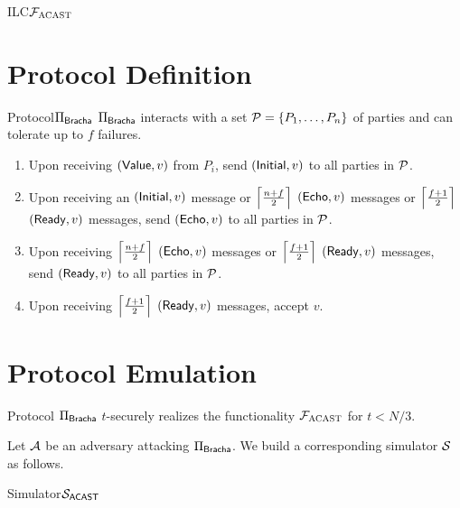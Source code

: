 \documentclass{llncs}
\begin{document}
\begin{boxdef}{ILC}{$\mathcal{{F}}_{\textsc{ACAST}}$}

\end{boxdef}

\section{Protocol Definition}

\begin{boxdef}{Protocol}{$\Pi_{\sf Bracha}$}
  $\Pi_{\sf Bracha}$ interacts with a set $\mathcal{{P}} = \{ P_1, \ldots, P_n \}$ of
  parties and can tolerate up to $f$ failures.
  \begin{enumerate}
    \item Upon receiving $({\sf Value}, v)$ from $P_i$, send $({\sf Initial},
  v)$ to all parties in $\mathcal{{P}}$.
  
    \item Upon receiving an $({\sf Initial}, v)$ message or
  $\left\lceil \frac{n+f}{2} \right\rceil$ $({\sf Echo}, v)$ messages or $\left\lceil \frac{f+1}{2} \right\rceil$
  $({\sf Ready}, v)$ messages, send $({\sf Echo}, v)$ to all parties in
  $\mathcal{{P}}$.

    \item Upon receiving $\left\lceil \frac{n+f}{2} \right\rceil$ $({\sf Echo}, v)$ messages or
  $\left\lceil \frac{f+1}{2} \right\rceil$ $({\sf Ready}, v)$ messages, send $({\sf Ready}, v)$ to
  all parties in $\mathcal{{P}}$.

    \item Upon receiving $\left\lceil \frac{f+1}{2} \right\rceil$ $({\sf Ready}, v)$ messages,
    accept $v$.
  \end{enumerate}
\end{boxdef}

\section{Protocol Emulation}

\begin{theorem}
Protocol $\Pi_{\sf Bracha}$ $t$-securely realizes the functionality $\mathcal{{F}}_{\textsc{ACAST}}$
for $t < N/3$.
\end{theorem}

\begin{proof-sketch}
Let $\mathcal{{A}}$ be an adversary attacking $\Pi_{\sf Bracha}$. We build a
corresponding simulator $\mathcal{{S}}$ as follows.

\begin{boxdef}{Simulator}{$\mathcal{{S}}_{\sf ACAST}$}
\end{boxdef}
\end{proof-sketch}
    


\end{document}
